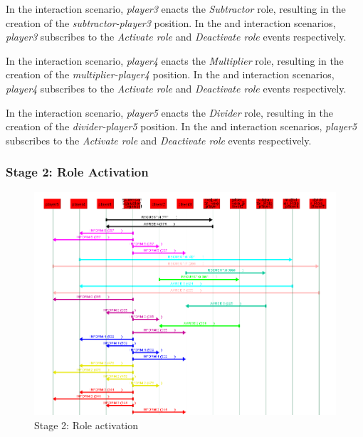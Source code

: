 In the {} interaction scenario, \textit{player3} enacts the \textit{Subtractor} role, resulting in the creation of the \textit{subtractor-player3} position.
In the {} and {} interaction scenarios, \textit{player3} subscribes to the \textit{Activate role} and \textit{Deactivate role} events respectively.

In the {} interaction scenario, \textit{player4} enacts the \textit{Multiplier} role, resulting in the creation of the \textit{multiplier-player4} position.
In the {} and {} interaction scenarios, \textit{player4} subscribes to the \textit{Activate role} and \textit{Deactivate role} events respectively.

In the {} interaction scenario, \textit{player5} enacts the \textit{Divider} role, resulting in the creation of the \textit{divider-player5} position.
In the {} and {} interaction scenarios, \textit{player5} subscribes to the \textit{Activate role} and \textit{Deactivate role} events respectively.

\subsubsection*{Stage 2: Role Activation}

\begin{figure}[H]
	\centering
	\includegraphics[width=\textwidth]{images/examples/example2-stage2}
	\caption{Stage 2: Role activation}
	\label{figure:example2-stage2}
\end{figure}

